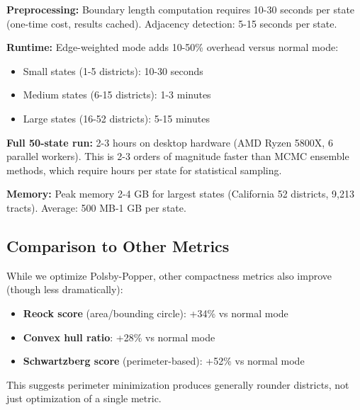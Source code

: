 \textbf{Preprocessing:} Boundary length computation requires 10-30 seconds per state (one-time cost, results cached). Adjacency detection: 5-15 seconds per state.

\textbf{Runtime:} Edge-weighted mode adds 10-50\% overhead versus normal mode:
\begin{itemize}
    \item Small states (1-5 districts): 10-30 seconds
    \item Medium states (6-15 districts): 1-3 minutes
    \item Large states (16-52 districts): 5-15 minutes
\end{itemize}

\textbf{Full 50-state run:} 2-3 hours on desktop hardware (AMD Ryzen 5800X, 6 parallel workers). This is 2-3 orders of magnitude faster than MCMC ensemble methods, which require hours per state for statistical sampling.

\textbf{Memory:} Peak memory 2-4 GB for largest states (California 52 districts, 9,213 tracts). Average: 500 MB-1 GB per state.

\subsection{Comparison to Other Metrics}

While we optimize Polsby-Popper, other compactness metrics also improve (though less dramatically):
\begin{itemize}
    \item \textbf{Reock score} (area/bounding circle): +34\% vs normal mode
    \item \textbf{Convex hull ratio}: +28\% vs normal mode
    \item \textbf{Schwartzberg score} (perimeter-based): +52\% vs normal mode
\end{itemize}

This suggests perimeter minimization produces generally rounder districts, not just optimization of a single metric.
